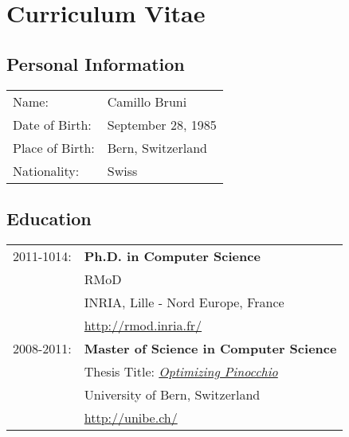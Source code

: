 
\chapter*{Curriculum Vitae}

\section*{Personal Information}
\begin{tabular}{ll}
	Name:           & Camillo Bruni \\
	Date of Birth:  & September 28, 1985 \\
	Place of Birth: & Bern, Switzerland \\
	Nationality:    & Swiss
\end{tabular}

\section*{Education}

\begin{tabular}{ll}
	2011-1014: & \textbf{Ph.D. in Computer Science} \\
	           & RMoD \\
	           & INRIA, Lille - Nord Europe, France \\
	           & \url{http://rmod.inria.fr/} \\
	2008-2011: & \textbf{Master of Science in Computer Science} \\
	           & Thesis Title: \href{http://scg.unibe.ch/archive/masters/Brun11a.pdf}{\emph{Optimizing Pinocchio}} \\
	           & University of Bern, Switzerland \\
	           & \url{http://unibe.ch/}
\end{tabular}



